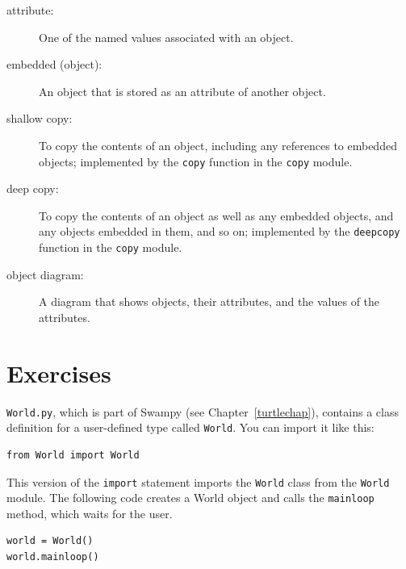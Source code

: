 \documentclass[10pt]{book}
\begin{document}
{\begin{description}
\item[attribute:] One of the named values associated with an object.

\item[embedded (object):] An object that is stored as an attribute
of another object.

\item[shallow copy:] To copy the contents of an object, including
any references to embedded objects;
implemented by the {\tt copy} function in the {\tt copy} module.

\item[deep copy:] To copy the contents of an object as well as any
embedded objects, and any objects embedded in them, and so on;
implemented by the {\tt deepcopy} function in the {\tt copy} module.

\item[object diagram:] A diagram that shows objects, their
attributes, and the values of the attributes.

\end{description}


\section{Exercises}

\begin{ex}
\label{canvas}


{\tt World.py}, which is part of Swampy (see Chapter~\ref{turtlechap}),
contains a class definition for a user-defined type called 
{\tt World}.  You can import it like this:

\beforeverb
\begin{verbatim}
from World import World
\end{verbatim}
\afterverb

This version of the {\tt import} statement imports the {\tt World}
class from the {\tt World} module.
The following code creates a World object and calls
the {\tt mainloop} method, which
waits for
the user.

\beforeverb
\begin{verbatim}
world = World()
world.mainloop()
\end{verbatim}
\afterverb


\end{ex}}
\end{document}
